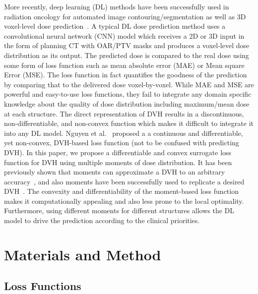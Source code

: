 \documentclass[10pt]{article}
\begin{document}
More recently, deep learning (DL) methods have been successfully used in  radiation oncology for automated image contouring/segmentation \cite{han2017mr,ibragimov2017segmentation,men2017automatic} as well as 3D voxel-level dose prediction~\cite{TreatmentPlanningReview-Wang2020}. A typical DL dose prediction method uses a convolutional neural network (CNN) model which receives a 2D or 3D input in the form of planning CT with OAR/PTV masks and produces a voxel-level dose distribution as its output. The predicted dose is compared to the real dose using some form of loss function such as mean absolute error (MAE) or Mean square Error (MSE). The loss function in fact quantifies the goodness of the prediction by comparing that to the delivered dose voxel-by-voxel. While MAE and MSE are powerful and easy-to-use loss functions, they fail to integrate any domain specific knowledge about the quality of dose distribution including maximum/mean dose at each structure. The direct representation of DVH results in a discontinuous, non-differentiable, and non-convex function which makes it difficult to integrate it into any DL model. Nguyen et al.~\cite{DVHLoss} proposed a a continuous and differentiable, yet non-convex, DVH-based loss function (not to be confused with predicting DVH).  In this paper, we propose a differentiable and convex surrogate loss function for DVH using multiple moments of dose distribution. It has been previously shown that moments can approximate a DVH to an arbitrary accuracy~\cite{zinchenko2008controlling}, and also moments have been successfully used to replicate a desired DVH~\cite{zarepisheh2013moment}. The convexity and differentiability of the moment-based loss function makes it computationally appealing and also less prone to the local optimality. Furthermore, using different moments for different structures allows the DL model to drive the prediction according to the clinical priorities. 


\section{Materials and Method}

\subsection{Loss Functions}

\end{document}
